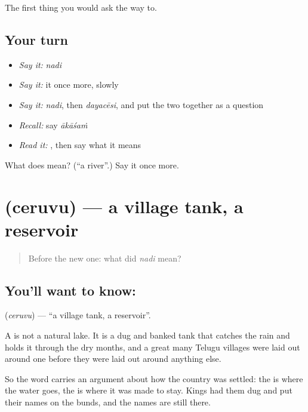 \begin{grammarlens}[title={What you've built}]
The first thing you would ask the way to.
\end{grammarlens}

\subsection*{Your turn}
\begin{itemize}
\raggedright
  \item \emph{Say it:} \emph{nadi}
  \item \emph{Say it:} it once more, slowly
  \item \emph{Say it:} \emph{nadi}, then \emph{dayacēsi}, and put the two together as a question
  \item \emph{Recall:} say \emph{ākāśaṁ}
  \item \emph{Read it:} \textbf{}, then say what it means
\end{itemize}

\begin{tcolorbox}[breakable,colback=teal!4,colframe=teal!35!black,title={Before you move on}]
What does  mean? (\textquotedblleft{}a river\textquotedblright{}.) Say it once more.
\end{tcolorbox}
\section[\texorpdfstring{\te{చెరువు} (ceruvu)}{చెరువు (ceruvu)}]{ (ceruvu) — a village tank, a reservoir}

\label{lesson:TE-C55-tank}



\begin{quote}
Before the new one: what did \emph{nadi} mean?
\end{quote}

\subsection*{You'll want to know: }
\textbf{} (\emph{ceruvu}) — \textquotedblleft{}a village tank, a reservoir\textquotedblright{}.

A  is not a natural lake. It is a dug and banked tank that catches the rain and holds it through the dry months, and a great many Telugu villages were laid out around one before they were laid out around anything else.

So the word carries an argument about how the country was settled: the  is where the water goes, the  is where it was made to stay. Kings had them dug and put their names on the bunds, and the names are still there.

